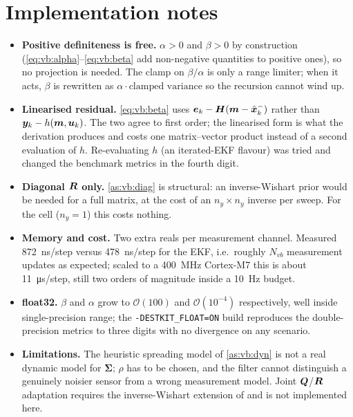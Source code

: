 \section{Implementation notes}
\begin{itemize}[leftmargin=1.4em]
\item \textbf{Positive definiteness is free.}  $\alpha>0$ and $\beta>0$ by construction
      (\eqref{eq:vb:alpha}--\eqref{eq:vb:beta} add non-negative quantities to positive ones), so no
      projection is needed.  The clamp on $\beta/\alpha$ is only a range limiter; when it acts,
      $\beta$ is rewritten as $\alpha\cdot\text{clamped variance}$ so the recursion cannot wind up.
\item \textbf{Linearised residual.}  \eqref{eq:vb:beta} uses
      $\bm{e}_k-\bm{H}(\bm m-\hat{\bm{x}}^{-}_k)$ rather than $\bm{y}_k-h(\bm m,\bm{u}_k)$.  The two agree to first
      order; the linearised form is what the derivation produces and costs one matrix--vector
      product instead of a second evaluation of $h$.  Re-evaluating $h$ (an iterated-EKF flavour)
      was tried and changed the benchmark metrics in the fourth digit.
\item \textbf{Diagonal $\bm{R}$ only.}  \cref{as:vb:diag} is structural: an inverse-Wishart prior would
      be needed for a full matrix, at the cost of an $n_y\times n_y$ inverse per sweep.  For the
      cell ($n_y=1$) this costs nothing.
\item \textbf{Memory and cost.}  Two extra reals per measurement channel.  Measured
      \SI{872}{\nano\second}/step versus \SI{478}{\nano\second}/step for the EKF, i.e.\ roughly
      $N_{vb}$ measurement updates as expected; scaled to a \SI{400}{\mega\hertz} Cortex-M7 this is
      about \SI{11}{\micro\second}/step, still two orders of magnitude inside a \SI{10}{\hertz}
      budget.
\item \textbf{float32.}  $\beta$ and $\alpha$ grow to $\mathcal{O}(100)$ and
      $\mathcal{O}(10^{-4})$ respectively, well inside single-precision range; the
      \texttt{-DESTKIT\_FLOAT=ON} build reproduces the double-precision metrics to three digits with
      no divergence on any scenario.
\item \textbf{Limitations.}  The heuristic spreading model of \cref{as:vb:dyn} is not a real dynamic
      model for $\bm\Sigma$; $\rho$ has to be chosen, and the filter cannot distinguish a genuinely
      noisier sensor from a wrong measurement model.  Joint $\bm{Q}$/$\bm{R}$ adaptation requires the
      inverse-Wishart extension of \cite{huang2018vbakf} and is not implemented here.
\end{itemize}

